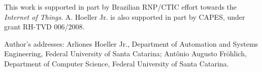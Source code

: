 \documentclass[prodmode,acmtecs]{acmsmall}
\begin{document}



\begin{bottomstuff}
This work is supported in part by Brazilian RNP/CTIC effort towards the \textit{Internet of Things}.
A. Hoeller Jr. is also supported in part by CAPES, under grant RH-TVD 006/2008.

Author's addresses:
Arliones Hoeller Jr., Department of Automation and Systems Engineering, Federal University of Santa Catarina;
Ant{\^o}nio Augusto Fr{\"o}hlich, Department of Computer Science, Federal University of Santa Catarina.
\end{bottomstuff}

\maketitle












\end{document}
